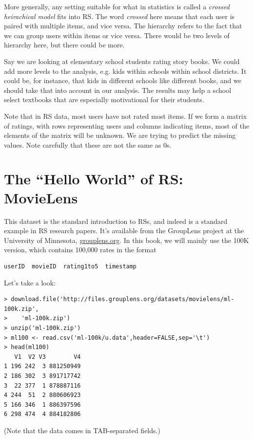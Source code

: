 More generally, any setting suitable for what in statistics is called
a \textit{crossed heirachical model} fits into RS.  The word
\textit{crossed} here means that each user is paired with multiple
items, and vice versa.  The hierarchy refers to the fact that we can
group users within items or vice versa.  There would be two levels of
hierarchy here, but there could be more.  

Say we are looking at elementary school students rating story books.  We
could add more levels to the analysis, e.g. kids within schools within
school districts.  It could be, for instance, that kids in different
schools like different books, and we should take that into account in
our analysis.  The results may help a school select textbooks that are
especially motivational for their students.

Note that in RS data, most users have not rated most items.  If we form
a matrix of ratings, with rows representing users and columns indicating
items, most of the elements of the matrix will be unknown.  We are
trying to predict the missing values.  Note carefully that these are not
the same as 0s.


\section{The ``Hello World'' of RS:  MovieLens}

This dataset is the standard introduction to RSs, and indeed is a
standard example in RS research papers.  It's available from the
GroupLens project at the University of Minnesota, \url{grouplens.org}.
In this book, we will mainly use the 100K version, which contains
100,000 rates in the format

\begin{lstlisting}
userID  movieID  rating1to5  timestamp
\end{lstlisting}

Let's take a look:

\begin{lstlisting}
> download.file('http://files.grouplens.org/datasets/movielens/ml-100k.zip', 
>    'ml-100k.zip') 
> unzip('ml-100k.zip') 
> ml100 <- read.csv('ml-100k/u.data',header=FALSE,sep='\t')
> head(ml100)
   V1  V2 V3        V4
1 196 242  3 881250949
2 186 302  3 891717742
3  22 377  1 878887116
4 244  51  2 880606923
5 166 346  1 886397596
6 298 474  4 884182806
\end{lstlisting}

(Note that the data comes in TAB-separated fields.)

